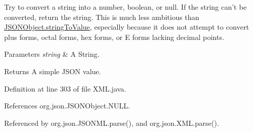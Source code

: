 Try to convert a string into a number, boolean, or null. If the string can't be converted, return the string. This is much less ambitious than \hyperlink{classorg_1_1json_1_1_j_s_o_n_object_a23f861897abe58eb41c044dd63667319}{J\-S\-O\-N\-Object.\-string\-To\-Value}, especially because it does not attempt to convert plus forms, octal forms, hex forms, or E forms lacking decimal points. 
\begin{DoxyParams}{Parameters}
{\em string} & A String. \\
\hline
\end{DoxyParams}
\begin{DoxyReturn}{Returns}
A simple J\-S\-O\-N value. 
\end{DoxyReturn}


Definition at line 303 of file X\-M\-L.\-java.



References org.\-json.\-J\-S\-O\-N\-Object.\-N\-U\-L\-L.



Referenced by org.\-json.\-J\-S\-O\-N\-M\-L.\-parse(), and org.\-json.\-X\-M\-L.\-parse().


